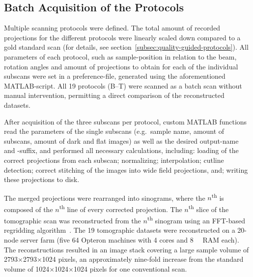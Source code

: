 \subsection{Batch Acquisition of the Protocols}
Multiple scanning protocols were defined. The total amount of recorded projections for the different protocols were linearly scaled down compared to a gold standard scan (for details, see section~\ref{subsec:quality-guided-protocols}). All parameters of each protocol, such as sample-position in relation to the beam, rotation angles and amount of projections to obtain for each of the individual subscans were set in a preference-file, generated using the aforementioned MATLAB-script. All 19 protocols (B--T) were scanned as a batch scan without manual intervention, permitting a direct comparison of the reconstructed datasets.

After acquisition of the three subscans per protocol, custom MATLAB functions read the parameters of the single subscans (e.g.\ sample name, amount of subscans, amount of dark and flat images) as well as the desired output-name and -suffix, and performed all necessary calculations, including: loading of the correct projections from each subscan; normalizing; interpolation; cutline detection; correct stitching of the images into wide field projections, and; writing these projections to disk.

The merged projections were rearranged into sinograms, where the $n$\textsuperscript{th} is composed of the $n$\textsuperscript{th} line of every corrected projection. The $n$\textsuperscript{th} slice of the tomographic scan was reconstructed from the $n$\textsuperscript{th} sinogram using an FFT-based regridding algorithm~\cite{Dowd1999}. The 19 tomographic datasets were reconstructed on a 20-node server farm (five \SI{64}{\bit} Opteron machines with 4 cores and \SI{8}{\giga\byte} RAM each). The reconstructions resulted in an image stack covering a large sample volume of 2793$\times$2793$\times$1024 pixels, an approximately nine-fold increase from the standard volume of 1024$\times$1024$\times$1024 pixels for one conventional scan.